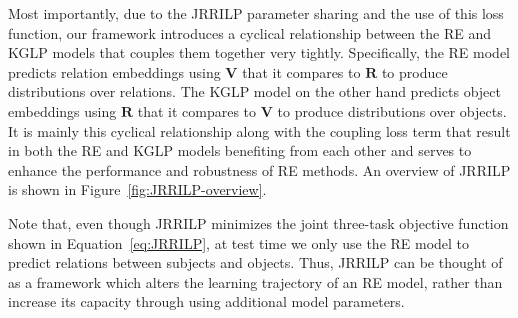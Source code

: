 Most importantly, due to the JRRILP parameter sharing and the use of this loss function, our framework introduces a cyclical relationship between the RE and KGLP models that couples them together very tightly.
Specifically, the RE model predicts relation embeddings using $\bm{V}$ that it compares to $\bm{R}$ to produce distributions over relations.
The KGLP model on the other hand predicts object embeddings using $\bm{R}$ that it compares to $\bm{V}$ to produce distributions over objects.
It is mainly this cyclical relationship along with the coupling loss term that result in both the RE and KGLP models benefiting from each other and serves to enhance the performance and robustness of RE methods.
An overview of JRRILP is shown in Figure~\ref{fig:JRRILP-overview}.

Note that, even though JRRILP minimizes the joint three-task objective function shown in Equation~\ref{eq:JRRILP}, at test time we only use the RE model to predict relations between subjects and objects.
Thus, JRRILP can be thought of as a framework which alters the learning trajectory of an RE model, rather than increase its capacity through using additional model parameters.



